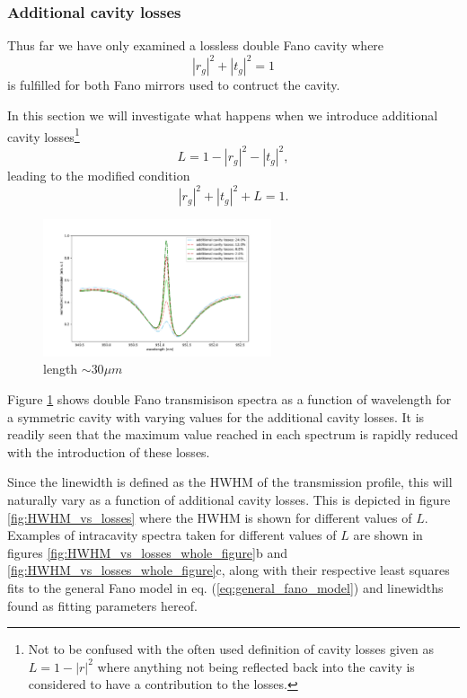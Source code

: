 \subsubsection{Additional cavity losses}

Thus far we have only examined a lossless double Fano cavity where
\begin{equation}
    |r_g|^2 + |t_g|^2 = 1
\end{equation}
is fulfilled for both Fano mirrors used to contruct the cavity.

In this section we will investigate what happens when we introduce additional cavity losses\footnote{Not to be confused with the often used definition of cavity losses given as $L=1-|r|^2$ where anything not being reflected back into the cavity is considered to have a contribution to the losses.}
\begin{equation}
    L = 1 - |r_g|^2 - |t_g|^2,
\end{equation}
leading to the modified condition
\begin{equation}
    |r_g|^2 + |t_g|^2 + L = 1.
\end{equation}

\begin{figure}[h!]
    \centering
    \includegraphics[width=0.6\textwidth]{figures/double_fano_loss_scan.pdf}
    \caption{length $\sim 30 \mu m$}
    \label{fig:double_loss_scan}
\end{figure}

Figure \ref{fig:double_loss_scan} shows double Fano transmisison spectra as a function of wavelength for a symmetric cavity with varying values for the additional cavity losses. It is readily seen that the maximum value reached in each spectrum is rapidly reduced with the introduction of these losses. 

Since the linewidth is defined as the HWHM of the transmission profile, this will naturally vary as a function of additional cavity losses. This is depicted in figure \ref{fig:HWHM_vs_losses} where the HWHM is shown for different values of $L$. Examples of intracavity spectra taken for different values of $L$ are shown in figures \ref{fig:HWHM_vs_losses_whole_figure}b and \ref{fig:HWHM_vs_losses_whole_figure}c, along with their respective least squares fits to the general Fano model in eq. (\ref{eq:general_fano_model}) and linewidths found as fitting parameters hereof. 

